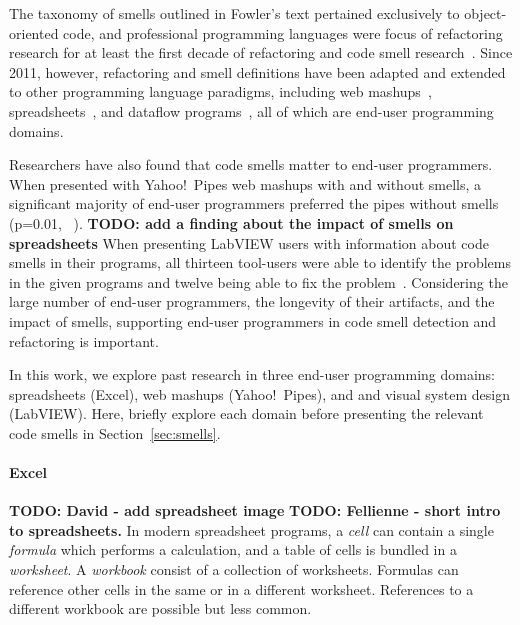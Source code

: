 \documentclass[10pt,conference,compsocconf]{IEEEtran}
\newcommand{\todo}[1]{\textbf{TODO: #1}}
\begin{document}
The taxonomy of smells outlined in Fowler's text pertained exclusively to object-oriented code, and professional programming languages were focus of refactoring research for at least the first decade of refactoring and code smell research~\cite{Mens:2004:SSR:972215.972286}.  Since 2011, however, refactoring and smell definitions have been adapted and extended to other 
programming language paradigms, including web mashups~\cite{Stolee2011, StoleeTSE2013}, spreadsheets~\cite{Hermans2011, Hermans2012inter, hermans2014bumblebee}, and dataflow programs~\cite{chambers2013smell}, all of which are  end-user programming domains. 

Researchers have also found that code smells matter to end-user programmers. When presented with Yahoo!\ Pipes web mashups with and without smells, a significant majority of end-user programmers preferred the pipes without smells (p=0.01, ~\cite{StoleeTSE2013}). 
\todo{add a finding about the impact of smells on spreadsheets} 
When presenting LabVIEW users with information about code smells in their programs, all thirteen tool-users were able to identify the problems in the given programs and twelve being able to fix the problem~\cite{chambers2013smell}.
Considering the large number of end-user programmers, the longevity of their artifacts, and the impact of smells, supporting end-user programmers in code smell detection and refactoring is important. 

In this work, we explore past research in three end-user programming domains: spreadsheets (Excel), web mashups (Yahoo!\ Pipes), and and visual system design (LabVIEW). Here, briefly explore each domain  before presenting the relevant code smells in  Section~\ref{sec:smells}.

\paragraph{Excel}
\todo{David - add spreadsheet image}
\todo{Fellienne - short intro to spreadsheets.}
In modern spreadsheet programs, a \textit{cell} can contain a single \textit{formula} which performs a calculation, and a table of cells is bundled in a \textit{worksheet}.
A \textit{workbook} consist of a collection of worksheets.
Formulas can reference other cells in the same or in a different worksheet.
References to a different workbook are possible but less common.
\end{document}
